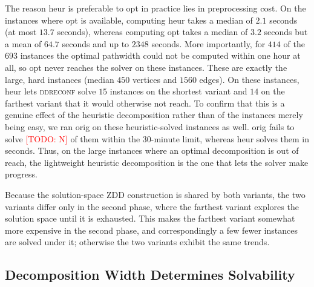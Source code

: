 \documentclass[conference]{IEEEtran}
\newcommand{\todo}[1]{\textcolor{red}{[TODO: #1]}}
\newcommand{\OrigDecom}{\textsf{orig}\xspace}
\newcommand{\HeurDecom}{\textsf{heur}\xspace}
\newcommand{\OptDecom}{\textsf{opt}\xspace}
\begin{document}
The reason \HeurDecom is preferable to \OptDecom in practice lies in
preprocessing cost.
On the instances where \OptDecom is available, computing \HeurDecom takes a
median of $2.1$ seconds (at most $13.7$ seconds), whereas computing \OptDecom
takes a median of $3.2$ seconds but a mean of $64.7$ seconds and up to
$2348$ seconds.
More importantly, for $414$ of the $693$ instances the optimal pathwidth could
not be computed within one hour at all, so \OptDecom never reaches the solver on
these instances.
These are exactly the large, hard instances (median $450$ vertices and $1560$
edges).
On these instances, \HeurDecom lets \textsc{ddreconf} solve $15$ instances on the
shortest variant and $14$ on the farthest variant that it would otherwise not
reach.
To confirm that this is a genuine effect of the heuristic decomposition rather than of
the instances merely being easy, we ran \OrigDecom on these heuristic-solved
instances as well.
\OrigDecom fails to solve \todo{N} of them within the $30$-minute limit, whereas
\HeurDecom solves them in seconds.
Thus, on the large instances where an optimal decomposition is out of reach, the
lightweight heuristic decomposition is the one that lets the solver make
progress.

Because the solution-space ZDD construction is shared by both variants, the two
variants differ only in the second phase, where the farthest variant explores the
solution space until it is exhausted.
This makes the farthest variant somewhat more expensive in the second phase, and
correspondingly a few fewer instances are solved under it; otherwise the two
variants exhibit the same trends.

\subsection{Decomposition Width Determines Solvability}
\label{subsec:solvability}
\end{document}
